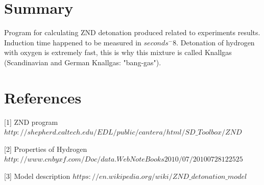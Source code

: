 \documentclass[a4paper]{article}
\begin{document}
\section{Summary}\label{sec:summary}
Program for calculating ZND detonation produced related to experiments results. Induction time happened to be measured in $seconds^-8$. Detonation of hydrogen with oxygen is extremely fast, this is why this mixture is called Knallgas (Scandinavian and German Knallgas: "bang-gas").


\section{References}\label{sec:refs}

 
[1] ZND program  \newline
$http://shepherd.caltech.edu/EDL/public/cantera/html/SD\_Toolbox/ZND$

[2] Properties of Hydrogen \newline
$http://www.cnbyxf.com/Doc/data.WebNoteBooks2010/07/20100728122525$

[3] Model description \newline
$https://en.wikipedia.org/wiki/ZND\_detonation\_model$
\end{document}
